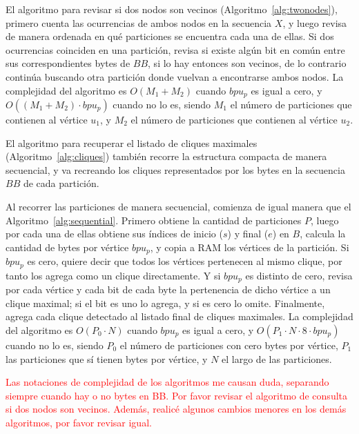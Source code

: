 El algoritmo para revisar si dos nodos son vecinos (Algoritmo~\ref{alg:twonodes}), primero cuenta las ocurrencias de ambos nodos en la secuencia $X$, y luego revisa de manera ordenada en qué particiones se encuentra cada una de ellas. Si dos ocurrencias coinciden en una partición, revisa si existe algún bit en común entre sus correspondientes bytes de $BB$, si lo hay entonces son vecinos, de lo contrario continúa buscando otra partición donde vuelvan a encontrarse ambos nodos. La complejidad del algoritmo es $O(M_{1} + M_{2})$ cuando $bpu_{p}$ es igual a cero, y $O((M_{1} + M_{2}) \cdot bpu_{p})$ cuando no lo es, siendo $M_{1}$ el número de particiones que contienen al vértice $u_{1}$, y $M_{2}$ el número de particiones que contienen al vértice $u_{2}$.

El algoritmo para recuperar el listado de cliques maximales (Algoritmo~\ref{alg:cliques}) también recorre la estructura compacta de manera secuencial, y va recreando los cliques representados por los bytes en la secuencia $BB$ de cada partición.

Al recorrer las particiones de manera secuencial, comienza de igual manera que el Algoritmo~\ref{alg:sequential}. Primero obtiene la cantidad de particiones $P$, luego por cada una de ellas obtiene sus índices de inicio ($s$) y final ($e$) en $B$, calcula la cantidad de bytes por vértice $bpu_{p}$, y copia a RAM los vértices de la partición. Si $bpu_{p}$ es cero, quiere decir que todos los vértices pertenecen al mismo clique, por tanto los agrega como un clique directamente. Y si $bpu_{p}$ es distinto de cero, revisa por cada vértice y cada bit de cada byte la pertenencia de dicho vértice a un clique maximal; si el bit es uno lo agrega, y si es cero lo omite. Finalmente, agrega cada clique detectado al listado final de cliques maximales. La complejidad del algoritmo es $O(P_{0} \cdot N)$ cuando $bpu_{p}$ es igual a cero, y $O(P_{1} \cdot N \cdot 8 \cdot bpu_{p})$ cuando no lo es, siendo $P_{0}$ el número de particiones con cero bytes por vértice, $P_{1}$ las particiones que sí tienen bytes por vértice, y $N$ el largo de las particiones.

\textcolor{red}{Las notaciones de complejidad de los algoritmos me causan duda, separando siempre cuando hay o no bytes en BB.}
\textcolor{red}{Por favor revisar el algoritmo de consulta si dos nodos son vecinos. Además, realicé algunos cambios menores en los demás algoritmos, por favor revisar igual.}









